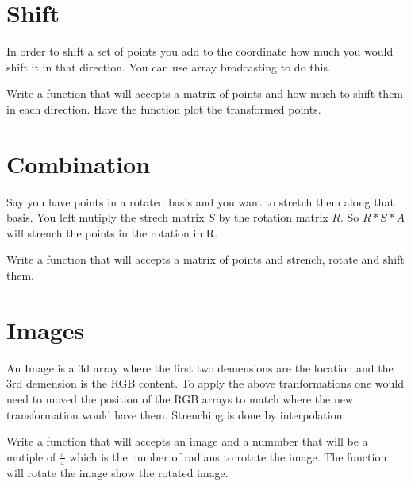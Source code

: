 \section*{Shift}
In order to shift a set of points you add to the coordinate how much you would shift it in that direction. You can use array brodcasting to do this.

\begin{problem}
Write a function that will accepts a matrix of points and how much to shift them in each direction. Have the function plot the transformed points.
\end{problem}

\section*{Combination}
Say you have points in a rotated basis and you want to stretch them along that basis. You left mutiply the strech matrix $S$ by the rotation matrix $R$. So $R*S*A$ will strench the points in the rotation in R. 

\begin{problem}
Write a function that will accepts a matrix of points and strench, rotate and shift them.
\end{problem}


\section*{Images}

An Image is a 3d array where the first two demensions are the location and the 3rd demension is the RGB content. To apply the above tranformations one would need to moved the position of the RGB arrays to match where the new transformation would have them. Strenching is done by
 interpolation.
\begin{problem}
Write a function that will accepts an image and a nummber that will be a mutiple of $\frac{\pi}{4}$ which is the number of radians to rotate the image. The function will rotate the image show the rotated image.
\end{problem}


% 
